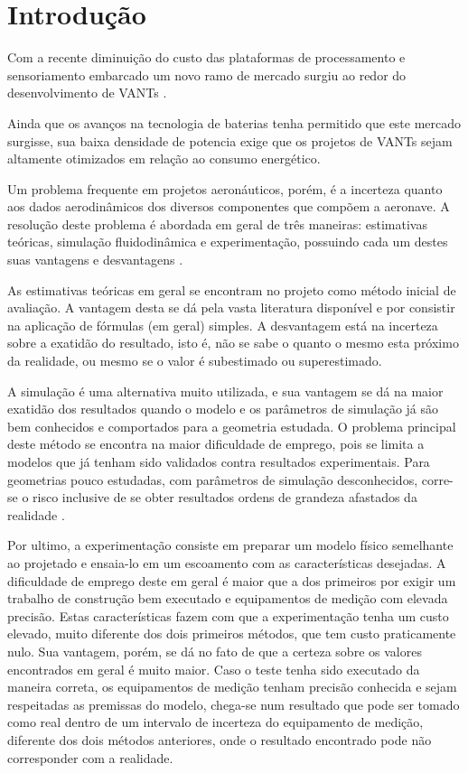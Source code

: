 \chapter{Introdução}\label{chp:intro}

Com a recente diminuição do custo das plataformas de processamento e sensoriamento embarcado \citep{perlmutter2012high} um novo ramo de mercado surgiu ao redor do desenvolvimento de VANTs \citep{brief2011growth}.

Ainda que os avanços na tecnologia de baterias tenha permitido que este mercado surgisse, sua baixa densidade de potencia \citep{nitta2015li} \citep{tarascon2011issues} exige que os projetos de VANTs sejam altamente otimizados em relação ao consumo energético.

Um problema frequente em projetos aeronáuticos, porém, é a incerteza quanto aos dados aerodinâmicos dos diversos componentes que compõem a aeronave. A resolução deste problema é abordada em geral de três maneiras: estimativas teóricas, simulação fluidodinâmica e experimentação, possuindo cada um destes suas vantagens e desvantagens \citep{anderson1995computational} .

As estimativas teóricas em geral se encontram no projeto como método inicial de avaliação. A vantagem desta se dá pela vasta literatura disponível e por consistir na aplicação de fórmulas (em geral) simples. A desvantagem está na incerteza sobre a exatidão do resultado, isto é, não se sabe o quanto o mesmo esta próximo da realidade, ou mesmo se o valor é subestimado ou superestimado.

A simulação é uma alternativa muito utilizada, e sua vantagem se dá na maior exatidão dos resultados quando o modelo e os parâmetros de simulação já são bem conhecidos e comportados para a geometria estudada. O problema principal deste método se encontra na maior dificuldade de emprego, pois se limita a modelos que já tenham sido validados contra resultados experimentais. Para geometrias pouco estudadas, com parâmetros de simulação desconhecidos, corre-se o risco inclusive de se obter resultados ordens de grandeza afastados da realidade \citep{anderson1995computational}.

Por ultimo, a experimentação consiste em preparar um modelo físico semelhante ao projetado e ensaia-lo em um escoamento com as características desejadas. A dificuldade de emprego deste em geral é maior que a dos primeiros por exigir um trabalho de construção bem executado e equipamentos de medição com elevada precisão. Estas características fazem com que a experimentação tenha um custo elevado, muito diferente dos dois primeiros métodos, que tem custo praticamente nulo. Sua vantagem, porém, se dá no fato de que a certeza sobre os valores encontrados em geral é muito maior. Caso o teste tenha sido executado da maneira correta, os equipamentos de medição tenham precisão conhecida e sejam respeitadas as premissas do modelo, chega-se num resultado que pode ser tomado como real dentro de um intervalo de incerteza do equipamento de medição, diferente dos dois métodos anteriores, onde o resultado encontrado pode não corresponder com a realidade.

